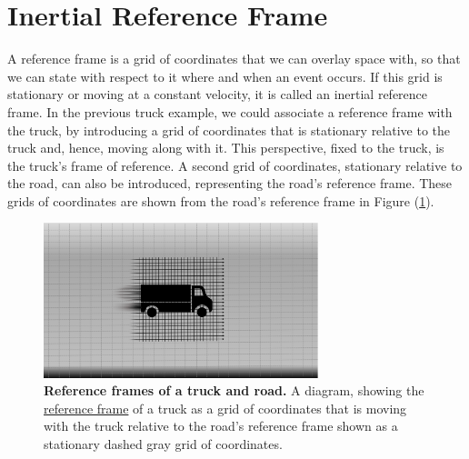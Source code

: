 \section{Inertial Reference Frame} \label{sect: Inertial Reference Frame}

A reference frame is a grid of coordinates that we can overlay space with, so that we can state with respect to it where and when an event occurs.
If this grid is stationary or moving at a constant velocity, it is called an inertial reference frame.
In the previous truck example, we could associate a reference frame with the truck, by introducing a grid of coordinates that is stationary relative to the truck and, hence, moving along with it.
This perspective, fixed to the truck, is the truck's frame of reference.
A second grid of coordinates, stationary relative to the road, can also be introduced, representing the road's reference frame.
These grids of coordinates are shown from the road's reference frame in Figure (\ref{fig: Reference Frames}).

\begin{figure}[H]
	\centering
	\includegraphics[width = 8cm]{images/pdf/Reference_Frames_of_truck_and_road.pdf}
	\caption{\textbf{Reference frames of a truck and road.} A diagram, showing the \protect\hyperlink{def-Reference-frame}{reference frame} of a truck as a grid of coordinates that is moving with the truck relative to the road's reference frame shown as a stationary dashed gray grid of coordinates.}
	\label{fig: Reference Frames}
\end{figure}

